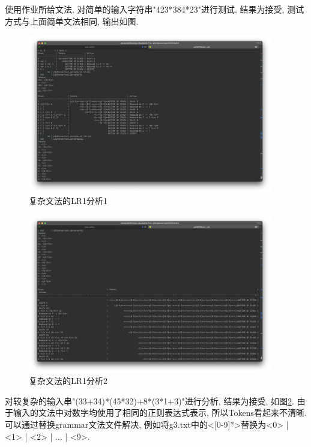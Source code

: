 使用作业所给文法, 对简单的输入字符串"423*384*23"进行测试, 结果为接受,
测试方式与上面简单文法相同, 输出如图.
\begin{figure}[ht!]
	\begin{center}
		\includegraphics[width=0.95\textwidth]{figures/lr1复杂分析1.png}
	\end{center}
	\caption{复杂文法的LR1分析1}
	\label{fig:复杂文法的LR1分析1}
\end{figure}

\begin{figure}[ht!]
	\begin{center}
		\includegraphics[width=0.95\textwidth]{figures/lr1复杂分析2.png}
	\end{center}
	\caption{复杂文法的LR1分析2}
	\label{fig:复杂文法的LR1分析2}
\end{figure}

对较复杂的输入串"(33+34)*(45*32)+8*(3*1+3)"进行分析, 结果为接受,
如图\ref{fig:复杂文法的LR1分析2}.
由于输入的文法中对数字均使用了相同的正则表达式表示, 所以Tokens看起来不清晰.
可以通过替换grammar文法文件解决, 例如将g3.txt中的<[0-9]*>替换为<0> | <1> | <2> |
... | <9>.


